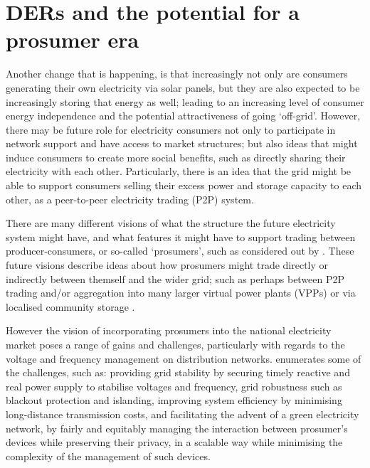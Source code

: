 \section{DERs and the potential for a prosumer era}

Another change that is happening, is that increasingly not only are consumers generating their own electricity via solar panels, but they are also expected to be increasingly storing that energy as well; leading to an increasing level of consumer energy independence and the potential attractiveness of going `off-grid'.
However, there may be future role for electricity consumers not only to participate in network support and have access to market structures; but also ideas that might induce consumers to create more social benefits, such as directly sharing their electricity with each other.
Particularly, there is an idea that the grid might be able to support consumers selling their excess power and storage capacity to each other, as a peer-to-peer electricity trading (P2P) system.

There are many different visions of what the structure the future electricity system might have, and what features it might have to support trading between producer-consumers, or so-called `prosumers', such as considered out by \cite{Parag2016}.
These future visions describe ideas about how prosumers might trade directly or indirectly between themself and the wider grid; such as perhaps between P2P trading and/or aggregation into many larger virtual power plants (VPPs) or via localised community storage \cite{Morstyn2018}.

However the vision of incorporating prosumers into the national electricity market poses a range of gains and challenges, particularly with regards to the voltage and frequency management on distribution networks.
\cite{BELL2018765} enumerates some of the challenges, such as: providing grid stability by securing timely reactive and real power supply to stabilise voltages and frequency, grid robustness such as blackout protection and islanding, improving system efficiency by minimising long-distance transmission costs, and facilitating the advent of a green electricity network, by fairly and equitably managing the interaction between prosumer's devices while preserving their privacy, in a scalable way while minimising the complexity of the management of such devices.


